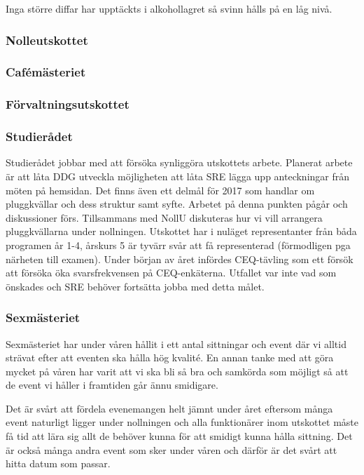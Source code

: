 \documentclass[../_main/handlingar.tex]{subfiles}
\begin{document}
Inga större diffar har upptäckts i alkohollagret så svinn hålls på en låg nivå.

\subsubsection*{Nolleutskottet}

\subsubsection*{Cafémästeriet}

\subsubsection*{Förvaltningsutskottet}

\subsubsection*{Studierådet}
Studierådet jobbar med att försöka synliggöra utskottets arbete. Planerat arbete är att låta DDG utveckla möjligheten att låta SRE lägga upp anteckningar från möten på hemsidan. Det finns även ett delmål för 2017 som handlar om pluggkvällar och dess struktur samt syfte. Arbetet på denna punkten pågår och diskussioner förs. Tillsammans med NollU diskuteras hur vi vill arrangera pluggkvällarna under nollningen. Utskottet har i nuläget representanter från båda programen år 1-4, årskurs 5 är tyvärr svår att få representerad (förmodligen pga närheten till examen). Under början av året infördes CEQ-tävling som ett försök att försöka öka svarsfrekvensen på CEQ-enkäterna. Utfallet var inte vad som önskades och SRE behöver fortsätta jobba med detta målet.  

\subsubsection*{Sexmästeriet}
Sexmästeriet har under våren hållit i ett antal sittningar och event där vi alltid strävat efter att eventen ska hålla hög kvalité. En annan tanke med att göra mycket på våren har varit att vi ska bli så bra och samkörda som möjligt så att de event vi håller i framtiden går ännu smidigare.

Det är svårt att fördela evenemangen helt jämnt under året eftersom många event naturligt ligger under nollningen och alla funktionärer inom utskottet måste få tid att lära sig allt de behöver kunna för att smidigt kunna hålla sittning. Det är också många andra event som sker under våren och därför är det svårt att hitta datum som passar.
\end{document}
